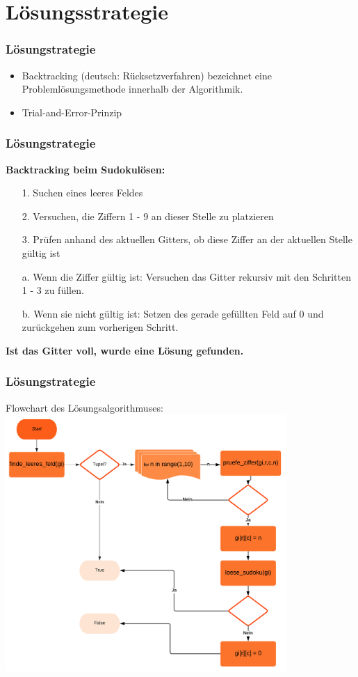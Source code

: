 \documentclass{beamer}
\begin{document}
\section{Lösungsstrategie}
\begin{frame}
	\frametitle{Lösungstrategie} 
	\begin{itemize}
		\item Backtracking (deutsch: Rücksetzverfahren) bezeichnet eine Problemlösungsmethode innerhalb der Algorithmik. 
		\item Trial-and-Error-Prinzip
	\end{itemize}
\end{frame}

\begin{frame}
	\frametitle{Lösungstrategie} 

	\textbf{Backtracking beim Sudokulösen:}
	
	\begin{itemize}
		\item [1.] Suchen eines leeres Feldes
\item [2.] Versuchen, die Ziffern 1 - 9 an dieser Stelle zu platzieren
	\item [3.] Prüfen anhand des aktuellen Gitters, ob diese Ziffer an der aktuellen Stelle gültig ist
	\item [a.] Wenn die Ziffer gültig ist: Versuchen das Gitter rekursiv mit den Schritten 1 - 3 zu füllen.
	\item [b.] Wenn sie nicht gültig ist: Setzen des gerade gefüllten Feld auf 0 und zurückgehen zum vorherigen Schritt.
	\end{itemize}
	\textbf{Ist das Gitter voll, wurde eine Lösung gefunden.}
\end{frame}

\begin{frame}
	\frametitle{Lösungstrategie} 
	Flowchart des Lösungsalgorithmuses:
		\centering
	\includegraphics[width=0.8\textwidth]{img/flow.png}
\end{frame}
\end{document}
